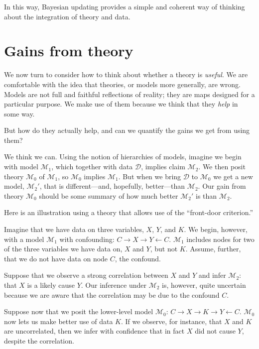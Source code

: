 \documentclass[
  12pt,
]{book}
\begin{document}
In this way, Bayesian updating provides a simple and coherent way of thinking about the integration of theory and data.

\hypertarget{theorygains}{%
\section{Gains from theory}\label{theorygains}}

We now turn to consider how to think about whether a theory is \emph{useful}. We are comfortable with the idea that theories, or models more generally, are wrong. Models are not full and faithful reflections of reality; they are maps designed for a particular purpose. We make use of them because we think that they \emph{help} in some way.

But how do they actually help, and can we quantify the gains we get from using them?

We think we can. Using the notion of hierarchies of models, imagine we begin with model \(\mathcal M_1\), which together with data \(\mathcal D\), implies claim \(\mathcal M_2\). We then posit theory \(\mathcal M_0\) of \(\mathcal M_1\), so \(\mathcal M_0\) implies \(\mathcal M_1\). But when we bring \(\mathcal D\) to \(\mathcal M_0\) we get a new model, \(\mathcal M_2'\), that is different---and, hopefully, better---than \(\mathcal M_2\). Our gain from theory \(\mathcal M_0\) should be some summary of how much better \(\mathcal M_2'\) is than \(\mathcal M_2\).

Here is an illustration using a theory that allows use of the ``front-door criterion.''

Imagine that we have data on three variables, \(X\), \(Y\), and \(K\). We begin, however, with a model \(\mathcal M_1\) with confounding: \(C \rightarrow X \rightarrow Y \leftarrow C\). \(\mathcal M_1\) includes nodes for two of the three variables we have data on, \(X\) and \(Y\), but not \(K\). Assume, further, that we do not have data on node \(C\), the confound.

Suppose that we observe a strong correlation between \(X\) and \(Y\) and infer \(\mathcal M_2\): that \(X\) is a likely cause \(Y\). Our inference under \(\mathcal M_2\) is, however, quite uncertain because we are aware that the correlation may be due to the confound \(C\).

Suppose now that we posit the lower-level model \(\mathcal M_0\): \(C \rightarrow X \rightarrow K \rightarrow Y \leftarrow C\). \(\mathcal M_0\) now lets us make better use of data \(K\). If we observe, for instance, that \(X\) and \(K\) are uncorrelated, then we infer with confidence that in fact \(X\) did not cause \(Y\), despite the correlation.
\end{document}

